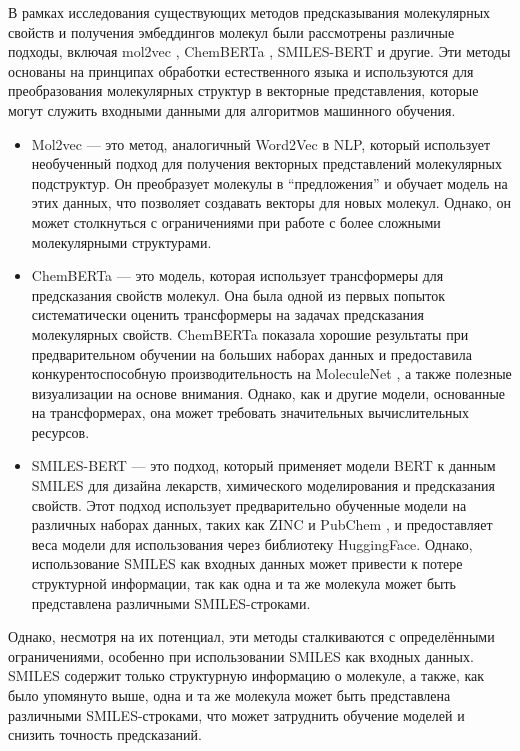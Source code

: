 В рамках исследования существующих методов предсказывания молекулярных свойств и получения эмбеддингов молекул были рассмотрены различные подходы, включая mol2vec \cite{mol2vec}, ChemBERTa \cite{ChemBERTa-2}, SMILES-BERT \cite{SMILESBERT} и другие. Эти методы основаны на принципах обработки естественного языка и используются для преобразования молекулярных структур в векторные представления, которые могут служить входными данными для алгоритмов машинного обучения.
\begin{itemize}
    \item Mol2vec \cite{mol2vec} — это метод, аналогичный Word2Vec в NLP, который использует необученный подход для получения векторных представлений молекулярных подструктур. Он преобразует молекулы в “предложения” и обучает модель на этих данных, что позволяет создавать векторы для новых молекул. Однако, он может столкнуться с ограничениями при работе с более сложными молекулярными структурами.

    \item ChemBERTa \cite{ChemBERTa-2} — это модель, которая использует трансформеры для предсказания свойств молекул. Она была одной из первых попыток систематически оценить трансформеры на задачах предсказания молекулярных свойств. ChemBERTa показала хорошие результаты при предварительном обучении на больших наборах данных и предоставила конкурентоспособную производительность на MoleculeNet \cite{moleculenet}, а также полезные визуализации на основе внимания. Однако, как и другие модели, основанные на трансформерах, она может требовать значительных вычислительных ресурсов.

    \item SMILES-BERT \cite{SMILESBERT} — это подход, который применяет модели BERT к данным SMILES для дизайна лекарств, химического моделирования и предсказания свойств. Этот подход использует предварительно обученные модели на различных наборах данных, таких как ZINC \cite{zinc} и PubChem \cite{pubchem}, и предоставляет веса модели для использования через библиотеку HuggingFace. Однако, использование SMILES как входных данных может привести к потере структурной информации, так как одна и та же молекула может быть представлена различными SMILES-строками.
\end{itemize}
Однако, несмотря на их потенциал, эти методы сталкиваются с определёнными ограничениями, особенно при использовании SMILES как входных данных. SMILES содержит только структурную информацию о молекуле, а также, как было упомянуто выше, одна и та же молекула может быть представлена различными SMILES-строками, что может затруднить обучение моделей и снизить точность предсказаний.

